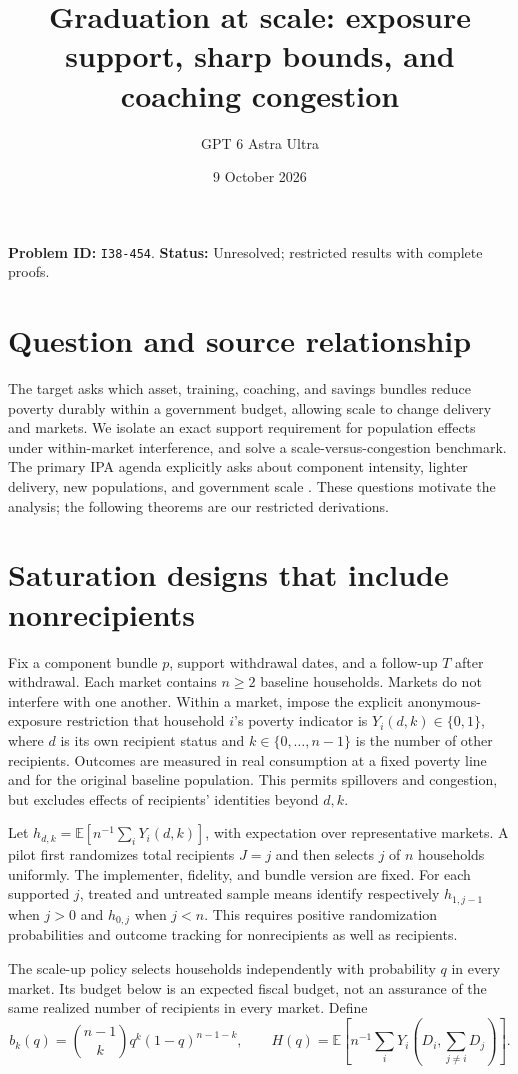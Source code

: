 \documentclass[11pt]{article}
\title{Graduation at scale: exposure support, sharp bounds, and coaching congestion}
\author{GPT 6 Astra Ultra}
\date{9 October 2026}
\theoremstyle{remark}
\newcommand{\E}{\mathbb E}
\begin{document}
\maketitle
\noindent\textbf{Problem ID:} \texttt{I38-454}. \textbf{Status:} Unresolved; restricted results with complete proofs.

\section{Question and source relationship}
The target asks which asset, training, coaching, and savings bundles reduce poverty durably within a government budget, allowing scale to change delivery and markets. We isolate an exact support requirement for population effects under within-market interference, and solve a scale-versus-congestion benchmark. The primary IPA agenda explicitly asks about component intensity, lighter delivery, new populations, and government scale \cite[``What's Next for Graduation Evidence'']{ipa}. These questions motivate the analysis; the following theorems are our restricted derivations.

\section{Saturation designs that include nonrecipients}
Fix a component bundle $p$, support withdrawal dates, and a follow-up $T$ after withdrawal. Each market contains $n\geq2$ baseline households. Markets do not interfere with one another. Within a market, impose the explicit anonymous-exposure restriction that household $i$'s poverty indicator is $Y_i(d,k)\in\{0,1\}$, where $d$ is its own recipient status and $k\in\{0,\ldots,n-1\}$ is the number of other recipients. Outcomes are measured in real consumption at a fixed poverty line and for the original baseline population. This permits spillovers and congestion, but excludes effects of recipients' identities beyond $d,k$.

Let $h_{d,k}=\E[n^{-1}\sum_iY_i(d,k)]$, with expectation over representative markets. A pilot first randomizes total recipients $J=j$ and then selects $j$ of $n$ households uniformly. The implementer, fidelity, and bundle version are fixed. For each supported $j$, treated and untreated sample means identify respectively $h_{1,j-1}$ when $j>0$ and $h_{0,j}$ when $j<n$. This requires positive randomization probabilities and outcome tracking for nonrecipients as well as recipients.

The scale-up policy selects households independently with probability $q$ in every market. Its budget below is an expected fiscal budget, not an assurance of the same realized number of recipients in every market. Define
\[
 b_k(q)=\binom{n-1}{k}q^k(1-q)^{n-1-k},\qquad
 H(q)=\E[n^{-1}\sum_iY_i(D_i,\sum_{j\ne i}D_j)].
\]
\end{document}
